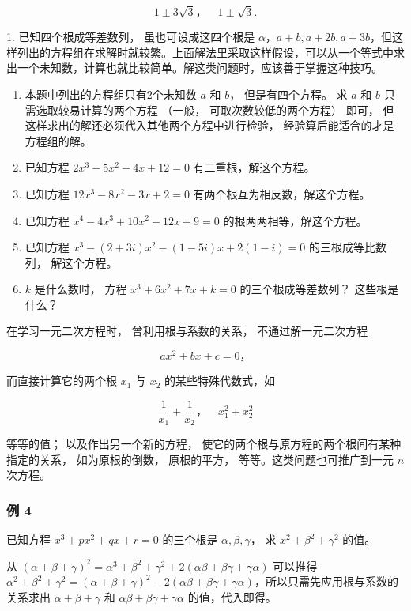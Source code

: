 \[
1 \pm 3 \sqrt {3}\text{，} \quad 1 \pm \sqrt {3}.
\]

 1. 已知四个根成等差数列， 虽也可设成这四个根是
\(\alpha\)，\(a + b, a + 2b, a + 3b\)，但这样列出的方程组在求解时就较繁。上面解法里采取这样假设，可以从一个等式中求出一个未知数，计算也就比较简单。解这类问题时，应该善于掌握这种技巧。

\begin{enumerate}[start=2]
\item
  本题中列出的方程组只有2个未知数 \(a\) 和 \(b\)， 但是有四个方程。 求
  \(a\) 和 \(b\) 只需选取较易计算的两个方程 （一般，
  可取次数较低的两个方程） 即可，
  但这样求出的解还必须代入其他两个方程中进行检验，
  经验算后能适合的才是方程组的解。
\item
  已知方程 \(2x^{3} - 5x^{2} - 4x + 12 = 0\) 有二重根，解这个方程。
\item
  已知方程 \(12x^{3} - 8x^{2} - 3x + 2 = 0\)
  有两个根互为相反数，解这个方程。
\item
  已知方程 \(x^4 - 4x^3 + 10x^2 - 12x + 9 = 0\)
  的根两两相等，解这个方程。
\item
  已知方程 \(x^{3} - (2 + 3i)x^{2} - (1 - 5i)x + 2(1 - i) = 0\)
  的三根成等比数列， 解这个方程。
\item
  \(k\) 是什么数时， 方程 \(x^{3} + 6x^{2} + 7x + k = 0\)
  的三个根成等差数列？ 这些根是什么？
\end{enumerate}

在学习一元二次方程时， 曾利用根与系数的关系， 不通过解一元二次方程

\[
a x ^ {2} + b x + c = 0\text{，}
\]

而直接计算它的两个根 \(x_{1}\) 与 \(x_{2}\) 的某些特殊代数式，如

\[
\frac {1}{x _ {1}} + \frac {1}{x _ {2}}\text{，} \quad x _ {1} ^ {2} + x _ {2} ^ {2}
\]

等等的值； 以及作出另一个新的方程，
使它的两个根与原方程的两个根间有某种指定的关系， 如为原根的倒数，
原根的平方， 等等。这类问题也可推广到一元 \(n\) 次方程。

\subsubsection{例 4}

已知方程 \(x^{3} + px^{2} + qx + r = 0\) 的三个根是
\(\alpha, \beta, \gamma\)， 求 \(x^{2} + \beta^{2} + \gamma^{2}\) 的值。

 从
\((\alpha + \beta + \gamma)^2 = \alpha^3 + \beta^2 + \gamma^2 + 2(\alpha \beta + \beta \gamma + \gamma \alpha)\)
可以推得
\(\alpha^2 +\beta^2 +\gamma^2 = (\alpha +\beta +\gamma)^2 -2(\alpha \beta +\beta \gamma +\gamma \alpha)\)，所以只需先应用根与系数的关系求出
\(\alpha +\beta +\gamma\) 和
\(\alpha \beta +\beta \gamma +\gamma \alpha\) 的值，代入即得。

